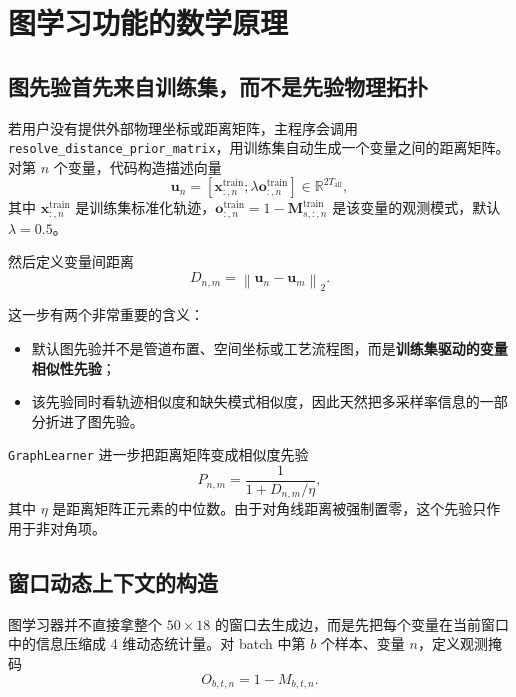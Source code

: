\documentclass[UTF8]{ctexart}
\begin{document}
\section{图学习功能的数学原理}

\subsection{图先验首先来自训练集，而不是先验物理拓扑}

若用户没有提供外部物理坐标或距离矩阵，主程序会调用 \texttt{resolve\_distance\_prior\_matrix}，用训练集自动生成一个变量之间的距离矩阵。对第 \(n\) 个变量，代码构造描述向量
\begin{equation}
    \bm{u}_n =
    \left[
        \bm{x}^{\text{train}}_{:,n};
        \lambda \bm{o}^{\text{train}}_{:,n}
    \right]
    \in \mathbb{R}^{2T_{\text{all}}},
\end{equation}
其中 \(\bm{x}^{\text{train}}_{:,n}\) 是训练集标准化轨迹，\(\bm{o}^{\text{train}}_{:,n}=1-\bm{M}^{\text{train}}_{s,:,n}\) 是该变量的观测模式，默认 \(\lambda=0.5\)。

然后定义变量间距离
\begin{equation}
    D_{n,m} = \left\lVert \bm{u}_n - \bm{u}_m \right\rVert_2.
\end{equation}

这一步有两个非常重要的含义：
\begin{itemize}
    \item 默认图先验并不是管道布置、空间坐标或工艺流程图，而是\textbf{训练集驱动的变量相似性先验}；
    \item 该先验同时看轨迹相似度和缺失模式相似度，因此天然把多采样率信息的一部分折进了图先验。
\end{itemize}

\texttt{GraphLearner} 进一步把距离矩阵变成相似度先验
\begin{equation}
    P_{n,m} = \frac{1}{1 + D_{n,m}/\eta},
\end{equation}
其中 \(\eta\) 是距离矩阵正元素的中位数。由于对角线距离被强制置零，这个先验只作用于非对角项。

\subsection{窗口动态上下文的构造}

图学习器并不直接拿整个 \(50 \times 18\) 的窗口去生成边，而是先把每个变量在当前窗口中的信息压缩成 4 维动态统计量。对 batch 中第 \(b\) 个样本、变量 \(n\)，定义观测掩码
\begin{equation}
    O_{b,t,n} = 1 - M_{b,t,n}.
\end{equation}
\end{document}
